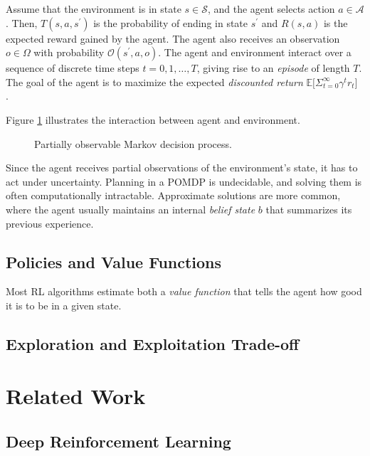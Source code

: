 Assume that the environment is in state \(s \in \mathcal{S}\), and the agent selects action \(a \in \mathcal{A}\).
Then, \(T(s, a, s^\prime)\) is the probability of ending in state \(s^\prime\) and \(R(s, a)\) is the expected reward gained by the agent.
The agent also receives an observation \(o \in \Omega\) with probability \(\mathcal{O}(s^\prime, a, o)\).
The agent and environment interact over a sequence of discrete time steps \(t = 0, 1, \dots, T\), giving rise to an \textit{episode} of length \(T\).
The goal of the agent is to maximize the expected \textit{discounted return} \(\mathbb{E} \lbrack \Sigma_{t=0}^\infty \gamma^t r_t \rbrack\).~\cite{kaelbling_pomdp_1998}

Figure \ref{fig:pomdp} illustrates the interaction between agent and environment.

\begin{figure}
    \centering
    
    \label{fig:pomdp}
    \caption{Partially observable Markov decision process.}
\end{figure}

Since the agent receives partial observations of the environment's state, it has to act under uncertainty.
Planning in a POMDP is undecidable, and solving them is often computationally intractable.
Approximate solutions are more common, where the agent usually maintains an internal \textit{belief state} \(b\) that summarizes its previous experience.


\subsection{Policies and Value Functions}

Most RL algorithms estimate both a \textit{value function} that tells the agent how good it is to be in a given state.
\cite{sutton_reinforcement_2018}

\subsection{Exploration and Exploitation Trade-off}


\section{Related Work}

\subsection{Deep Reinforcement Learning}

